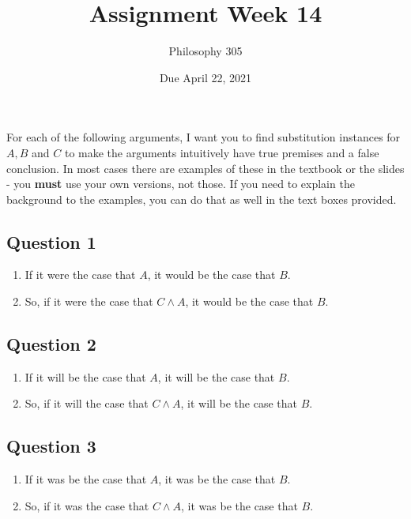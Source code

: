 \documentclass[
  11pt,
]{article}
\title{Assignment Week 14}
\author{Philosophy 305}
\date{Due April 22, 2021}
\providecommand{\tightlist}{%
  \setlength{\itemsep}{0pt}\setlength{\parskip}{0pt}}
\begin{document}
\maketitle

For each of the following arguments, I want you to find substitution
instances for \(A, B\) and \(C\) to make the arguments intuitively have
true premises and a false conclusion. In most cases there are examples
of these in the textbook or the slides - you \textbf{must} use your own
versions, not those. If you need to explain the background to the
examples, you can do that as well in the text boxes provided.

\hypertarget{question-1}{%
\subsection{Question 1}\label{question-1}}

\begin{enumerate}
\def\labelenumi{\arabic{enumi}.}
\tightlist
\item
  If it were the case that \(A\), it would be the case that \(B\).
\item
  So, if it were the case that \(C \wedge A\), it would be the case that
  \(B\).
\end{enumerate}

\hypertarget{question-2}{%
\subsection{Question 2}\label{question-2}}

\begin{enumerate}
\def\labelenumi{\arabic{enumi}.}
\tightlist
\item
  If it will be the case that \(A\), it will be the case that \(B\).
\item
  So, if it will the case that \(C \wedge A\), it will be the case that
  \(B\).
\end{enumerate}

\hypertarget{question-3}{%
\subsection{Question 3}\label{question-3}}

\begin{enumerate}
\def\labelenumi{\arabic{enumi}.}
\tightlist
\item
  If it was be the case that \(A\), it was be the case that \(B\).
\item
  So, if it was the case that \(C \wedge A\), it was be the case that
  \(B\).
\end{enumerate}
\end{document}
